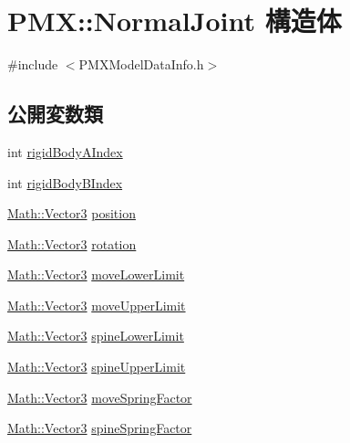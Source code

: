 \hypertarget{struct_p_m_x_1_1_normal_joint}{}\section{P\+MX\+:\+:Normal\+Joint 構造体}
\label{struct_p_m_x_1_1_normal_joint}


{\ttfamily \#include $<$P\+M\+X\+Model\+Data\+Info.\+h$>$}

\subsection*{公開変数類}
\begin{DoxyCompactItemize}
\item 
int \mbox{\hyperlink{struct_p_m_x_1_1_normal_joint_a21fbe75bde83bd5eb64af8ed6a110dbb}{rigid\+Body\+A\+Index}}
\item 
int \mbox{\hyperlink{struct_p_m_x_1_1_normal_joint_a0573cd817e582f79fcc492dd5eedc213}{rigid\+Body\+B\+Index}}
\item 
\mbox{\hyperlink{struct_math_1_1_vector3}{Math\+::\+Vector3}} \mbox{\hyperlink{struct_p_m_x_1_1_normal_joint_a9245f9bcc449b6d828a0e0640b8962bf}{position}}
\item 
\mbox{\hyperlink{struct_math_1_1_vector3}{Math\+::\+Vector3}} \mbox{\hyperlink{struct_p_m_x_1_1_normal_joint_a1f747a5d51ac70a44822f114f8fbb7e3}{rotation}}
\item 
\mbox{\hyperlink{struct_math_1_1_vector3}{Math\+::\+Vector3}} \mbox{\hyperlink{struct_p_m_x_1_1_normal_joint_af7e59d3b4098fda7eb10ddf6bac1e58a}{move\+Lower\+Limit}}
\item 
\mbox{\hyperlink{struct_math_1_1_vector3}{Math\+::\+Vector3}} \mbox{\hyperlink{struct_p_m_x_1_1_normal_joint_a042707368ef4543705f3fc5f4030db04}{move\+Upper\+Limit}}
\item 
\mbox{\hyperlink{struct_math_1_1_vector3}{Math\+::\+Vector3}} \mbox{\hyperlink{struct_p_m_x_1_1_normal_joint_a2ed10c367270c270765c7e077c9e43ad}{spine\+Lower\+Limit}}
\item 
\mbox{\hyperlink{struct_math_1_1_vector3}{Math\+::\+Vector3}} \mbox{\hyperlink{struct_p_m_x_1_1_normal_joint_aaf74dd6ffb85b798ae05c4fbaee4255f}{spine\+Upper\+Limit}}
\item 
\mbox{\hyperlink{struct_math_1_1_vector3}{Math\+::\+Vector3}} \mbox{\hyperlink{struct_p_m_x_1_1_normal_joint_a93fe3ebae8b7a4623c02a6e47fee307b}{move\+Spring\+Factor}}
\item 
\mbox{\hyperlink{struct_math_1_1_vector3}{Math\+::\+Vector3}} \mbox{\hyperlink{struct_p_m_x_1_1_normal_joint_add7c59899aad19b22d5d267544661373}{spine\+Spring\+Factor}}
\end{DoxyCompactItemize}


